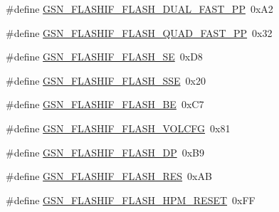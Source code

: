 \begin{DoxyCompactItemize}
\item 
\#define \hyperlink{a00501_af4275dba6f24912447b7129827a5d8bb}{GSN\_\-FLASHIF\_\-FLASH\_\-DUAL\_\-FAST\_\-PP}~0xA2
\item 
\#define \hyperlink{a00501_a274fa8a403899c45566125a6feadc764}{GSN\_\-FLASHIF\_\-FLASH\_\-QUAD\_\-FAST\_\-PP}~0x32
\item 
\#define \hyperlink{a00501_a0c24b2e54b8c103b6a101b70c34de782}{GSN\_\-FLASHIF\_\-FLASH\_\-SE}~0xD8
\item 
\#define \hyperlink{a00501_ae96a29a0882c74eb23ccec5f8bacd7e0}{GSN\_\-FLASHIF\_\-FLASH\_\-SSE}~0x20
\item 
\#define \hyperlink{a00501_ab7fd0cfaf7e0dc856a389a06650cab92}{GSN\_\-FLASHIF\_\-FLASH\_\-BE}~0xC7
\item 
\#define \hyperlink{a00501_aab2968a7a313ab5fb8eb33a9819e90ea}{GSN\_\-FLASHIF\_\-FLASH\_\-VOLCFG}~0x81
\item 
\#define \hyperlink{a00501_a99d00ac36ec9a0a644f5e86b4e9cbf60}{GSN\_\-FLASHIF\_\-FLASH\_\-DP}~0xB9
\item 
\#define \hyperlink{a00501_af16953f77ced6efee096609e6d22201d}{GSN\_\-FLASHIF\_\-FLASH\_\-RES}~0xAB
\item 
\#define \hyperlink{a00501_aac5384128253000bd94033b0ecb54b8d}{GSN\_\-FLASHIF\_\-FLASH\_\-HPM\_\-RESET}~0xFF
\end{DoxyCompactItemize}
